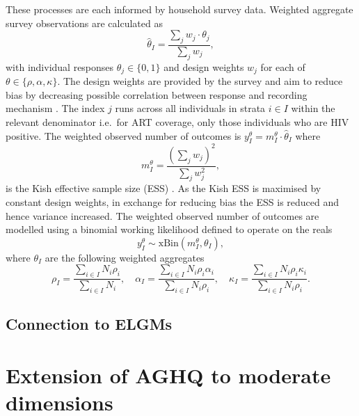 \documentclass[a4paper, nobind]{templates/ociamthesis}
\begin{document}
These processes are each informed by household survey data.
Weighted aggregate survey observations are calculated as
\begin{equation*}
\hat \theta_I = \frac{\sum_j w_j \cdot\theta_j}{\sum_j w_j},
\end{equation*}
with individual responses \(\theta_j \in \{0, 1\}\) and design weights \(w_j\) for each of \(\theta \in \{\rho, \alpha, \kappa\}\).
The design weights are provided by the survey and aim to reduce bias by decreasing possible correlation between response and recording mechanism \autocite{meng2018statistical}.
The index \(j\) runs across all individuals in strata \(i \in I\) within the relevant denominator i.e.~for ART coverage, only those individuals who are HIV positive.
The weighted observed number of outcomes is \(y^{\theta}_{I} = m^{\theta}_{I} \cdot \hat \theta_{I}\) where
\begin{equation*}
m^{\theta}_I = \frac{\left(\sum_j w_j\right)^2}{\sum_j w_j^2},
\end{equation*}
is the Kish effective sample size (ESS) \autocite{kish1965survey}.
As the Kish ESS is maximised by constant design weights, in exchange for reducing bias the ESS is reduced and hence variance increased.
The weighted observed number of outcomes are modelled using a binomial working likelihood \autocite{chen2014use} defined to operate on the reals
\begin{equation*}
y^{\theta}_{I} \sim \text{xBin}(m^{\theta}_{I}, \theta_{I}),
\end{equation*}
where \(\theta_{I}\) are the following weighted aggregates
\begin{equation*}
\rho_{I} = \frac{\sum_{i \in I} N_i \rho_i}{\sum_{i \in I} N_i}, \quad
\alpha_{I} = \frac{\sum_{i \in I} N_i \rho_i \alpha_i}{\sum_{i \in I} N_i \rho_i}, \quad
\kappa_{I} = \frac{\sum_{i \in I} N_i \rho_i \kappa_i}{\sum_{i \in I} N_i \rho_i}.
\end{equation*}

\hypertarget{connection-to-elgms}{%
\subsection{Connection to ELGMs}\label{connection-to-elgms}}

\hypertarget{extension-of-aghq-to-moderate-dimensions}{%
\section{Extension of AGHQ to moderate dimensions}\label{extension-of-aghq-to-moderate-dimensions}}
\end{document}
